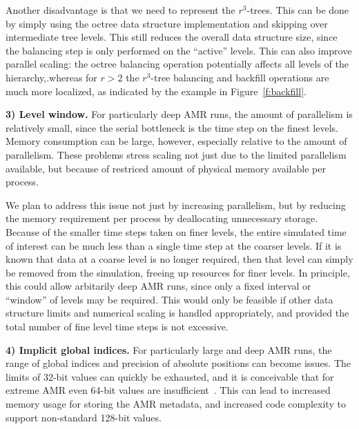 \documentclass[10pt,twocolumn]{article}
\begin{document}


Another disadvantage is that we need to represent the $r^3$-trees.
This can be done by simply using the octree data structure
implementation and skipping over intermediate tree levels.  This still
reduces the overall data structure size, since the balancing step is
only performed on the ``active'' levels.  This can also improve
parallel scaling: the octree balancing operation potentially affects
all levels of the hierarchy,.whereas for $r>2$ the $r^3$-tree
balancing and backfill operations are much more localized, as
indicated by the example in Figure~\ref{f:backfill}.


\textbf{3) Level window.}  For particularly deep AMR runs, the
amount of parallelism is relatively small, since the serial bottleneck
is the time step on the finest levels.  Memory consumption can be
large, however, especially relative to the amount of parallelism.
These problems stress scaling not just due to the limited parallelism
available, but because of restriced amount of physical memory
available per process.

We plan to address this issue not just by increasing parallelism, but
by reducing the memory requirement per process by deallocating
unnecessary storage.  Because of the smaller time steps taken on finer
levels, the entire simulated time of interest can be much less than a
single time step at the coarser levels.  If it is known that data at a
coarse level is no longer required, then that level can simply be
removed from the simulation, freeing up resources for finer levels.
In principle, this could allow arbitarily deep AMR runs, since only a
fixed interval or ``window'' of levels may be required.  This would
only be feasible if other data structure limits and numerical scaling
is handled appropriately, and provided the total number of fine level
time steps is not excessive.

\textbf{4) Implicit global indices.}  For particularly large and deep
AMR runs, the range of global indices and precision of absolute
positions can become issues.  The limits of 32-bit values can quickly
be exhausted, and it is conceivable that for extreme AMR even 64-bit
values are insufficient~\cite{@@@abel-abel-128bit}.  This can lead to
increased memory usage for storing the AMR metadata, and increased
code complexity to support non-standard 128-bit values.
\end{document}
